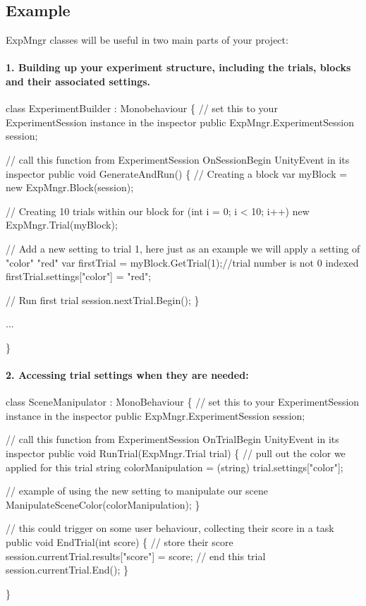 \subsection*{Example}

Exp\+Mngr classes will be useful in two main parts of your project\+:

\paragraph*{1. Building up your experiment structure, including the trials, blocks and their associated settings.}


\begin{DoxyCode}
class ExperimentBuilder : Monobehaviour
\{
    // set this to your ExperimentSession instance in the inspector
    public ExpMngr.ExperimentSession session;

    // call this function from ExperimentSession OnSessionBegin UnityEvent in its inspector
    public void GenerateAndRun() 
    \{
        // Creating a block
        var myBlock = new ExpMngr.Block(session); 

        // Creating 10 trials within our block
        for (int i = 0; i < 10; i++)
            new ExpMngr.Trial(myBlock);

        // Add a new setting to trial 1, here just as an example we will apply a setting of "color" "red" 
        var firstTrial = myBlock.GetTrial(1);//trial number is not 0 indexed
        firstTrial.settings["color"] = "red";

        // Run first trial
        session.nextTrial.Begin();
    \}

    ...

\}
\end{DoxyCode}


\paragraph*{2. Accessing trial settings when they are needed\+:}


\begin{DoxyCode}
class SceneManipulator : MonoBehaviour
\{
    // set this to your ExperimentSession instance in the inspector
    public ExpMngr.ExperimentSession session;

    // call this function from ExperimentSession OnTrialBegin UnityEvent in its inspector
    public void RunTrial(ExpMngr.Trial trial)
    \{
        // pull out the color we applied for this trial
        string colorManipulation = (string) trial.settings["color"];

        // example of using the new setting to manipulate our scene
        ManipulateSceneColor(colorManipulation);
    \}

    // this could trigger on some user behaviour, collecting their score in a task
    public void EndTrial(int score)
    \{
        // store their score
        session.currentTrial.results["score"] = score;
        // end this trial
        session.currentTrial.End();
    \}

\}
\end{DoxyCode}


